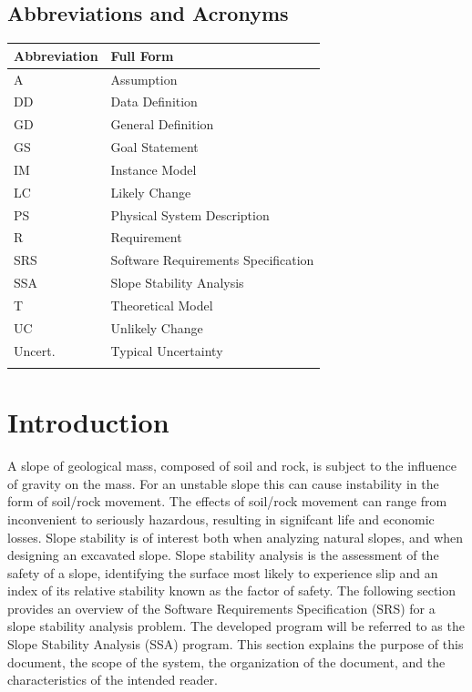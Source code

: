 \documentclass[12pt]{article}
\begin{document}
\subsection{Abbreviations and Acronyms}
\label{Sec:TAbbAcc}
\begin{longtable*}{l l}
\toprule
Abbreviation & Full Form
\\
\midrule
A & Assumption
\\
DD & Data Definition
\\
GD & General Definition
\\
GS & Goal Statement
\\
IM & Instance Model
\\
LC & Likely Change
\\
PS & Physical System Description
\\
R & Requirement
\\
SRS & Software Requirements Specification
\\
SSA & Slope Stability Analysis
\\
T & Theoretical Model
\\
UC & Unlikely Change
\\
Uncert. & Typical Uncertainty
\\
\bottomrule
\label{Table:TAbbAcc}
\end{longtable*}
\section{Introduction}
\label{Sec:Intro}
A slope of geological mass, composed of soil and rock, is subject to the influence of gravity on the mass. For an unstable slope this can cause instability in the form of soil/rock movement. The effects of soil/rock movement can range from inconvenient to seriously hazardous, resulting in signifcant life and economic losses. Slope stability is of interest both when analyzing natural slopes, and when designing an excavated slope. Slope stability analysis is the assessment of the safety of a slope, identifying the surface most likely to experience slip and an index of its relative stability known as the factor of safety.
The following section provides an overview of the Software Requirements Specification (SRS) for a slope stability analysis problem. The developed program will be referred to as the Slope Stability Analysis (SSA) program. This section explains the purpose of this document, the scope of the system, the organization of the document, and the characteristics of the intended reader.
\end{document}
